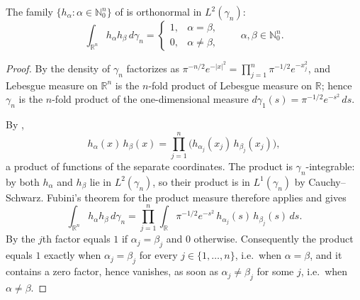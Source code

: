\begin{lemma}
The family $\{h_\alpha : \alpha \in \mathbb{N}_0^n\}$ of  is
orthonormal in $L^2(\gamma_n)$:
\[
  \int_{\mathbb{R}^n} h_\alpha h_\beta \, d\gamma_n
    = \begin{cases} 1, & \alpha = \beta,\\ 0, & \alpha \neq \beta,\end{cases}
  \qquad \alpha, \beta \in \mathbb{N}_0^n .
\]
\end{lemma}
\begin{proof}
By  the density of $\gamma_n$ factorizes as
$\pi^{-n/2}e^{-|x|^2} = \prod_{j=1}^n \pi^{-1/2}e^{-x_j^2}$, and Lebesgue measure
on $\mathbb{R}^n$ is the $n$-fold product of Lebesgue measure on $\mathbb{R}$;
hence $\gamma_n$ is the $n$-fold product of the one-dimensional measure
$d\gamma_1(s) = \pi^{-1/2}e^{-s^2}\,ds$.

By ,
\[
  h_\alpha(x)\, h_\beta(x)
    = \prod_{j=1}^n \bigl(h_{\alpha_j}(x_j)\, h_{\beta_j}(x_j)\bigr),
\]
a product of functions of the separate coordinates.  The product is
$\gamma_n$-integrable: by  both $h_\alpha$ and $h_\beta$
lie in $L^2(\gamma_n)$, so their product is in $L^1(\gamma_n)$ by
Cauchy--Schwarz.  Fubini's theorem for the product measure therefore applies and
gives
\[
  \int_{\mathbb{R}^n} h_\alpha h_\beta \, d\gamma_n
    = \prod_{j=1}^n \int_{\mathbb{R}} \pi^{-1/2}e^{-s^2}\,
        h_{\alpha_j}(s)\, h_{\beta_j}(s)\, ds .
\]
By  the $j$th factor equals $1$ if
$\alpha_j = \beta_j$ and $0$ otherwise.  Consequently the product equals $1$
exactly when $\alpha_j = \beta_j$ for every $j \in \{1,\ldots,n\}$, i.e.\ when
$\alpha = \beta$, and it contains a zero factor, hence vanishes, as soon as
$\alpha_j \neq \beta_j$ for some $j$, i.e.\ when $\alpha \neq \beta$.
\end{proof}
